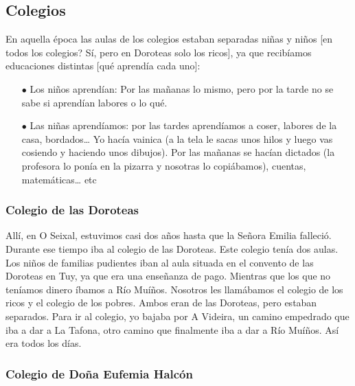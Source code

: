 \documentclass[12pt,a5paper]{book}
\begin{document}
\subsection*{Colegios}

En aquella época las aulas de los colegios estaban separadas niñas y niños [en todos los colegios? Sí, pero en Doroteas solo los ricos], ya que recibíamos educaciones distintas [qué aprendía cada uno]:

\begin{itemize}
	\item[$\bullet$] Los niños aprendían: Por las mañanas lo mismo, pero por la tarde no se sabe si aprendían labores o lo qué.
	\item[$\bullet$] Las niñas aprendíamos: por las tardes aprendíamos a coser, labores de la casa, bordados… Yo hacía vainica (a la tela le sacas unos hilos y luego vas cosiendo y haciendo unos dibujos). Por las mañanas se hacían dictados (la profesora lo ponía en la pizarra y nosotras lo copiábamos), cuentas, matemáticas… etc
\end{itemize}




\subsubsection*{Colegio de las Doroteas}

Allí, en O Seixal, estuvimos casi dos años hasta que la Señora Emilia falleció. Durante ese tiempo iba al colegio de las Doroteas.
Este colegio tenía dos aulas. Los niños de familias pudientes iban al aula situada en el convento de las Doroteas en Tuy, ya que era una enseñanza de pago. Mientras que los que no teníamos dinero íbamos a Río Muíños. Nosotros les llamábamos el colegio de los ricos y el colegio de los pobres. Ambos eran de las Doroteas, pero estaban separados.
Para ir al colegio, yo bajaba por A Videira, un camino empedrado que iba a dar a La Tafona, otro camino que finalmente iba a dar a Río Muíños. Así era todos los días.


\subsubsection*{Colegio de Doña Eufemia Halcón}
\end{document}
